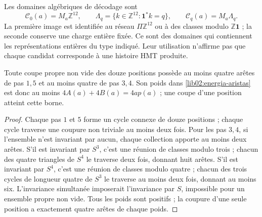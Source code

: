 Les domaines algébriques de décodage sont
\[
 \mathcal C_0(a)=M_a\mathbb Z^{12},\qquad
 \Lambda_q=\{k\in\mathbb Z^{12}:\mathbf1^*k=q\},\qquad
 \mathcal C_q(a)=M_a\Lambda_q.
\]
La première image est identifiée au réseau \(\Pi\mathbb Z^{12}\)
ou à des classes modulo \(\mathbb Z\mathbf1\) ; la seconde conserve une
charge entière fixée. Ce sont des domaines qui contiennent les représentations entières
du type indiqué. Leur utilisation n’affirme pas que chaque candidat corresponde à une
histoire HMT produite.

\begin{lemma}
\label{lib02:cortes}
Toute coupe propre non vide des douze positions possède au moins quatre arêtes de pas \(1,5\) et au moins quatre de pas \(3,4\). Son poids dans \eqref{lib02:energia-aristas} est donc au moins \(4A(a)+4B(a)=4ap(a)\) ; une coupe d'une position atteint cette borne.
\end{lemma}
\begin{proof}
Chaque pas \(1\) et \(5\) forme un cycle connexe de douze positions ;
chaque cycle traverse une coupure non triviale au moins deux fois. Pour les pas
\(3,4\), si l’ensemble n’est invariant par aucun, chaque collection
apporte au moins deux arêtes. S’il est invariant par \(S^3\), c’est une réunion
de classes modulo trois ; chacun des quatre triangles de \(S^4\)
le traverse deux fois, donnant huit arêtes. S’il est invariant par \(S^4\),
c’est une réunion de classes modulo quatre ; chacun des trois cycles de longueur
quatre de \(S^3\) le traverse au moins deux fois, donnant au moins six.
L’invariance simultanée imposerait l’invariance par \(S\), impossible
pour un ensemble propre non vide. Tous les poids sont positifs ; la
coupure d’une seule position a exactement quatre arêtes de chaque
poids.
\end{proof}

